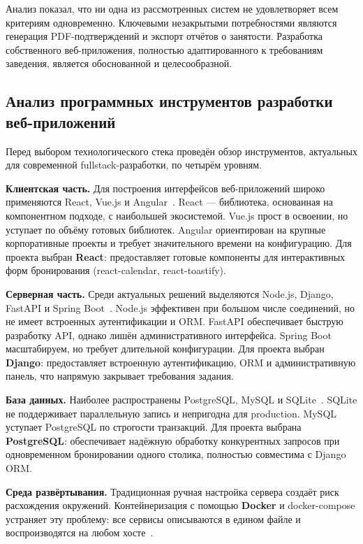 Анализ показал, что ни одна из рассмотренных систем не удовлетворяет
всем критериям одновременно. Ключевыми незакрытыми потребностями
являются генерация PDF-подтверждений и экспорт отчётов о занятости.
Разработка собственного веб-приложения, полностью адаптированного
к требованиям заведения, является обоснованной и целесообразной.

\subsection{Анализ программных инструментов разработки
веб-приложений}
\label{subsec:tools}

Перед выбором технологического стека проведён обзор инструментов,
актуальных для современной fullstack-разработки, по четырём уровням.

\textbf{Клиентская часть.} Для построения интерфейсов веб-приложений
широко применяются React, Vue.js и Angular~\cite{react_docs}. React ---
библиотека, основанная на компонентном подходе, с наибольшей
экосистемой. Vue.js прост в освоении, но уступает по объёму готовых
библиотек. Angular ориентирован на крупные корпоративные проекты и
требует значительного времени на конфигурацию. Для проекта выбран
\textbf{React}: предоставляет готовые компоненты для интерактивных
форм бронирования (react-calendar, react-toastify).

\textbf{Серверная часть.} Среди актуальных решений выделяются Node.js,
Django, FastAPI и Spring Boot~\cite{django_docs}. Node.js эффективен
при большом числе соединений, но не имеет встроенных аутентификации
и ORM. FastAPI обеспечивает быструю разработку API, однако лишён
административного интерфейса. Spring Boot масштабируем, но требует
длительной конфигурации. Для проекта выбран \textbf{Django}:
предоставляет встроенную аутентификацию, ORM и административную
панель, что напрямую закрывает требования задания.

\textbf{База данных.} Наиболее распространены PostgreSQL, MySQL и
SQLite~\cite{postgres_docs}. SQLite не поддерживает параллельную
запись и непригодна для production. MySQL уступает PostgreSQL по
строгости транзакций. Для проекта выбрана \textbf{PostgreSQL}:
обеспечивает надёжную обработку конкурентных запросов при
одновременном бронировании одного столика, полностью совместима
с Django ORM.

\textbf{Среда развёртывания.} Традиционная ручная настройка сервера
создаёт риск расхождения окружений. Контейнеризация с помощью
\textbf{Docker} и docker-compose устраняет эту проблему: все сервисы
описываются в едином файле и воспроизводятся на любом
хосте~\cite{docker_docs}.













